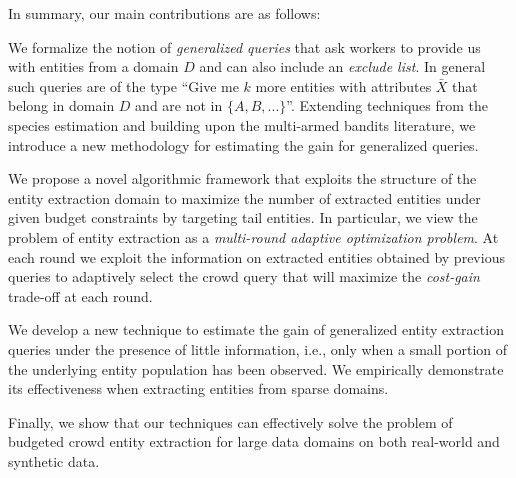 In summary, our main contributions are as follows:
\squishlist
\item We formalize the notion of {\em generalized queries} that ask workers to provide us with entities from a domain $D$ and can also include an {\em exclude list}. In general such queries are of the type ``Give me $k$ more entities with attributes $\bar{X}$ that belong in domain $D$ and are not in $\{A, B, ...\}$''.  Extending techniques from the species estimation and building upon the multi-armed bandits literature, we introduce a new methodology for estimating the gain for generalized queries. 
\item We propose a novel algorithmic framework that exploits the structure of the entity extraction domain to maximize the number of extracted entities under given budget constraints by targeting tail entities. In particular, we view the problem of entity extraction as a {\em multi-round adaptive optimization problem}. At  each round we exploit the information on extracted entities obtained by previous queries to adaptively select the crowd query that will maximize the {\em cost-gain} trade-off at each round. 
\item We develop a new technique to estimate the gain of generalized entity extraction queries under the presence of little information, i.e., only when a small portion of the underlying entity population has been observed. We empirically demonstrate its effectiveness when extracting entities from sparse domains.
\item Finally, we show that our techniques can effectively solve the problem of budgeted crowd entity extraction for large data domains on both real-world and synthetic data.
\squishend

%

